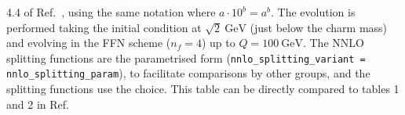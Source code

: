 \begin{table}[p]
{    4.4 of Ref.~\cite{Dittmar:2005ed}, using the same notation where
    $a\cdot10^{b} = a^b$. The evolution is performed taking the
    initial condition at $\sqrt{2}~\text{GeV}$ (just below the charm
    mass) and evolving in the FFN scheme ($n_f = 4$) up to
    $Q=100~\text{GeV}$.
    The NNLO splitting functions are the parametrised form
    (\texttt{nnlo\_splitting\_variant = nnlo\_splitting\_param}), to 
    facilitate comparisons by other groups, and the \ntlo splitting
    functions use the
     choice. This table can be directly compared to tables 1 and 2 in Ref.~\cite{Cooper-Sarkar:2024crx}}
  \label{tab:n3lo-evolve-nf4}
\end{table}



